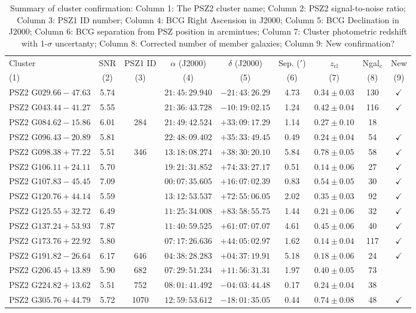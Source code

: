 \documentclass[apj, revtex4-1]{emulateapj}
\begin{document}
\begin{table}
	\caption[Summary of Cluster Confirmation]{Summary of cluster confirmation: Column 1: The PSZ2 cluster name; Column 2: PSZ2 signal-to-noise ratio; Column 3: PSZ1 ID number; Column 4: BCG Right Ascension in J2000; Column 5: BCG Declination in J2000; Column 6: BCG separation from PSZ position in arcmintues; Column 7: Cluster photometric redshift with 1-$\sigma$ uncertanty; Column 8: Corrected number of member galaxies; Column 9: New confirmation? }
	\centering
	\begin{tabular}{lcccccccc}
	\hline
	Cluster & SNR & PSZ1 ID & $\alpha$ (J2000) & $\delta$ (J2000) & Sep. ($'$) & $z_\mathrm{cl}$ & Ngal$_c$ & New\\
	(1) & (2) & (3) & (4) & (5) & (6) & (7) & (8) & (9) \\
	\hline
	 PSZ2 G$029.66-47.63$ & 5.74 & \nd & $21:45:29.940$ & $-21:43:26.29$ & 4.73 & $0.34 \pm 0.03$ & 130 & $\checkmark$ \\
	 PSZ2 G$043.44-41.27$ & 5.55 & \nd & $21:36:43.728$ & $-10:19:02.15$ & 1.24 & $0.42 \pm 0.04$ & 116 & $\checkmark$ \\
	 PSZ2 G$084.62-15.86$ & 6.01 & 284 & $21:49:42.524$ & $+33:09:17.29$ & 1.14 & $0.27 \pm 0.10$ & 18 & \\
	 PSZ2 G$096.43-20.89$ & 5.81 & \nd & $22:48:09.402$ & $+35:33:49.45$ & 0.49 & $0.24 \pm 0.04$ & 54 & $\checkmark$ \\
	 PSZ2 G$098.38+77.22$ & 5.51 & 346 & $13:18:08.274$ & $+38:30:20.10$ & 5.84 & $0.78 \pm 0.05$ & 58 & $\checkmark$ \\
	 PSZ2 G$106.11+24.11$ & 5.70 & \nd & $19:21:31.852$ & $+74:33:27.17$ & 0.51 & $0.14 \pm 0.06$ & 27 & $\checkmark$ \\
	 PSZ2 G$107.83-45.45$ & 7.09 & \nd & $00:07:35.605$ & $+16:07:02.39$ & 0.83 & $0.54 \pm 0.05$ & 30 & $\checkmark$ \\
	 PSZ2 G$120.76+44.14$ & 5.59 & \nd & $13:12:53.537$ & $+72:55:06.05$ & 2.02 & $0.35 \pm 0.03$ & 92 & $\checkmark$ \\
	 PSZ2 G$125.55+32.72$ & 6.49 & \nd & $11:25:34.008$ & $+83:58:55.75$ & 1.44 & $0.21 \pm 0.06$ & 32 & $\checkmark$ \\
	 PSZ2 G$137.24+53.93$ & 7.87 & \nd & $11:40:59.525$ & $+61:07:07.07$ & 4.61 & $0.45 \pm 0.06$ & 40 & $\checkmark$ \\
	 PSZ2 G$173.76+22.92$ & 5.80 & \nd & $07:17:26.636$ & $+44:05:02.97$ & 1.62 & $0.14 \pm 0.04$ & 117 & $\checkmark$ \\
	 PSZ2 G$191.82-26.64$ & 6.17 & 646 & $04:38:28.283$ & $+04:37:19.91$ & 5.18 & $0.18 \pm 0.06$ & 24 & $\checkmark$ \\
	 PSZ2 G$206.45+13.89$ & 5.90 & 682 & $07:29:51.234$ & $+11:56:31.31$ & 1.97 & $0.40 \pm 0.05$ & 73 & \\
	 PSZ2 G$224.82+13.62$ & 5.51 & 752 & $08:01:41.492$ & $-04:03:44.48$ & 0.17 & $0.24 \pm 0.04$ & 38 & \\
	 PSZ2 G$305.76+44.79$ & 5.72 & 1070 & $12:59:53.612$ & $-18:01:35.05$ & 0.44 & $0.74 \pm 0.08$ & 48 & $\checkmark$ \\
	\hline
	\end{tabular}
\label{tbl:results}
\end{table}
\end{document}
